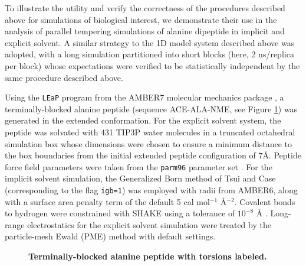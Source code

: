 To illustrate the utility and verify the correctness of the procedures described above for simulations of biological interest, we demonstrate their use in the analysis of parallel tempering simulations of alanine dipeptide in implicit and explicit solvent.  A similar strategy to the 1D model system described above was adopted, with a long simulation partitioned into short blocks (here, 2 ns/replica per block) whose expectations were verified to be statistically independent by the same procedure described above.

Using the {\tt LEaP} program from the AMBER7 molecular mechanics package \cite{AMBER7}, a terminally-blocked alanine peptide (sequence ACE-ALA-NME, see Figure \ref{wham:figure:alanine-dipeptide}) was generated in the extended conformation.  For the explicit solvent system, the peptide was solvated with 431 TIP3P water molecules \cite{jorgensen:1983a} in a truncated octahedral simulation box whose dimensions were chosen to ensure a minimum distance to the box boundaries from the initial extended peptide configuration of $7$\AA.  Peptide force field parameters were taken from the {\tt parm96} parameter set \cite{AMBER-parm96}.  For the implicit solvent simulation, the Generalized Born method of Tsui and Case \cite{tsui:2000a} (corresponding to the flag {\tt igb=1}) was employed with radii from AMBER6, along with a surface area penalty term of the default 5 cal mol$^{-1}$ \AA$^{-2}$.  Covalent bonds to hydrogen were constrained with SHAKE using a tolerance of $10^{-8}$ \AA$ $ \cite{SHAKE}.  Long-range electrostatics for the explicit solvent simulation were treated by the particle-mesh Ewald (PME) method \cite{darden:1993a} with default settings.

\begin{figure}[tb]
  \begin{center}
  \end{center}
  \caption{{\bf Terminally-blocked alanine peptide with \mbox{\boldmath{$(\phi,\psi)$}} torsions labeled.}}
  \label{wham:figure:alanine-dipeptide}
\end{figure}

